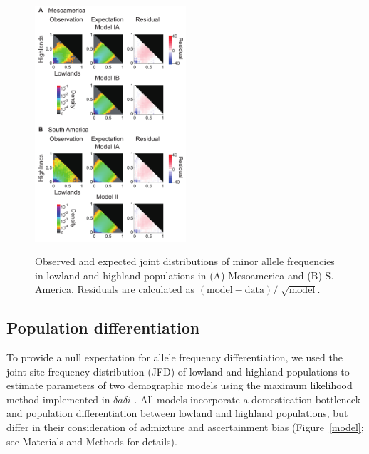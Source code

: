 \begin{figure}[tb]   
  \begin{center}
   \vspace{-0mm}
   \includegraphics[width=0.5\textwidth]{fig/Fig4}
   \renewcommand{\baselinestretch}{0.9}
   \vspace{-3mm}
   \caption{Observed and expected joint distributions of minor allele frequencies in lowland and highland populations in (A) Mesoamerica and (B) S. America. Residuals are calculated as  $(\mbox{model}-\mbox{data})/\sqrt[]{\mbox{model}}$.}
\vspace{-6mm}
    \label{JFD}
  \end{center}
\end{figure}

\subsection*{Population differentiation}

To provide a null expectation for allele frequency differentiation, we used the joint site frequency distribution (JFD) of lowland and highland populations to estimate parameters of two demographic models  using the maximum likelihood method implemented in $\delta a \delta i$ \cite[]{Gutenkunst_2009_19851460}.  
All models incorporate a domestication bottleneck \cite[]{Wright_2005_15919994} and population differentiation between lowland and highland populations, but differ in their consideration of admixture and ascertainment bias (Figure~\ref{model}; see Materials and Methods for details).

